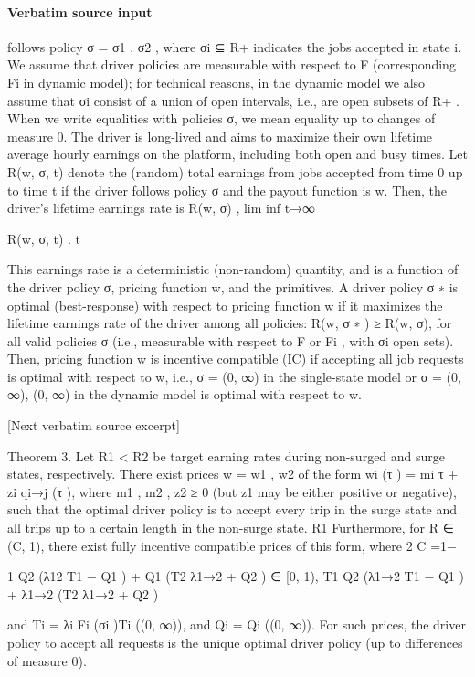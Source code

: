 \documentclass[10pt]{article}
\begin{document}
\paragraph{Verbatim source input}
\begin{ReviewVerbatim}
follows policy σ = {σ1 , σ2 }, where σi ⊆ R+ indicates the jobs accepted in state i. We assume that
driver policies are measurable with respect to F (corresponding Fi in dynamic model); for technical
reasons, in the dynamic model we also assume that σi consist of a union of open intervals, i.e., are
open subsets of R+ . When we write equalities with policies σ, we mean equality up to changes of
measure 0.
The driver is long-lived and aims to maximize their own lifetime average hourly earnings on the
platform, including both open and busy times. Let R(w, σ, t) denote the (random) total earnings
from jobs accepted from time 0 up to time t if the driver follows policy σ and the payout function
is w. Then, the driver’s lifetime earnings rate is
R(w, σ) , lim inf t→∞

R(w, σ, t)
.
t

This earnings rate is a deterministic (non-random) quantity, and is a function of the driver policy
σ, pricing function w, and the primitives.
A driver policy σ ∗ is optimal (best-response) with respect to pricing function w if it maximizes
the lifetime earnings rate of the driver among all policies: R(w, σ ∗ ) ≥ R(w, σ), for all valid policies
σ (i.e., measurable with respect to F or Fi , with σi open sets). Then, pricing function w is incentive
compatible (IC) if accepting all job requests is optimal with respect to w, i.e., σ = (0, ∞) in
the single-state model or σ = {(0, ∞), (0, ∞)} in the dynamic model is optimal with respect to w.

[Next verbatim source excerpt]

Theorem 3. Let R1 < R2 be target earning rates during non-surged and surge states, respectively.
There exist prices w = {w1 , w2 } of the form
wi (τ ) = mi τ + zi qi→j (τ ),
where m1 , m2 , z2 ≥ 0 (but z1 may be either positive or negative), such that the optimal driver policy
is to accept every trip in the surge state and all trips up to a certain length in the non-surge state.
R1
Furthermore, for R
∈ (C, 1), there exist fully incentive compatible prices of this form, where
2
C =1−

1 Q2 (λ12 T1 − Q1 ) + Q1 (T2 λ1→2 + Q2 )
∈ [0, 1),
T1 Q2 (λ1→2 T1 − Q1 ) + λ1→2 (T2 λ1→2 + Q2 )

and Ti = λi Fi (σi )Ti ((0, ∞)), and Qi = Qi ((0, ∞)). For such prices, the driver policy to accept all
requests is the unique optimal driver policy (up to differences of measure 0).


\end{ReviewVerbatim}
\end{document}

